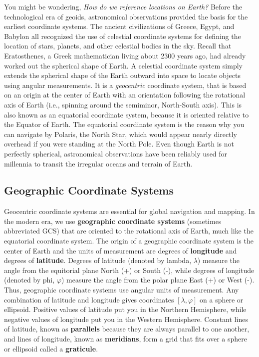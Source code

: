 \documentclass[
]{book}
\begin{document}
You might be wondering, \emph{How do we reference locations on Earth?} Before the technological era of geoids, astronomical observations provided the basis for the earliest coordinate systems. The ancient civilizations of Greece, Egypt, and Babylon all recognized the use of celestial coordinate systems for defining the location of stars, planets, and other celestial bodies in the sky. Recall that Eratosthenes, a Greek mathematician living about 2300 years ago, had already worked out the spherical shape of Earth. A celestial coordinate system simply extends the spherical shape of the Earth outward into space to locate objects using angular measurements. It is a \emph{geocentric} coordinate system, that is based on an origin at the center of Earth with an orientation following the rotational axis of Earth (i.e., spinning around the semiminor, North-South axis). This is also known as an equatorial coordinate system, because it is oriented relative to the Equator of Earth. The equatorial coordinate system is the reason why you can navigate by Polaris, the North Star, which would appear nearly directly overhead if you were standing at the North Pole. Even though Earth is not perfectly spherical, astronomical observations have been reliably used for millennia to transit the irregular oceans and terrain of Earth.

\hypertarget{geographic-coordinate-systems}{%
\subsection{Geographic Coordinate Systems}\label{geographic-coordinate-systems}}

Geocentric coordinate systems are essential for global navigation and mapping. In the modern era, we use \textbf{geographic coordinate systems} (sometimes abbreviated GCS) that are oriented to the rotational axis of Earth, much like the equatorial coordinate system. The origin of a geographic coordinate system is the center of Earth and the units of measurement are degrees of \textbf{longitude} and degrees of \textbf{latitude}. Degrees of latitude (denoted by lambda, \(λ\)) measure the angle from the equitorial plane North (+) or South (-), while degrees of longitude (denoted by phi, \(φ\)) measure the angle from the polar plane East (+) or West (-). Thus, geographic coordinate systems use angular units of measurement. Any combination of latitude and longitude gives coordinates \([λ,φ]\) on a sphere or ellipsoid. Positive values of latitude put you in the Northern Hemisphere, while negative values of longitude put you in the Western Hemisphere. Constant lines of latitude, known as \textbf{parallels} because they are always parallel to one another, and lines of longitude, known as \textbf{meridians}, form a grid that fits over a sphere or ellipsoid called a \textbf{graticule}.
\end{document}
